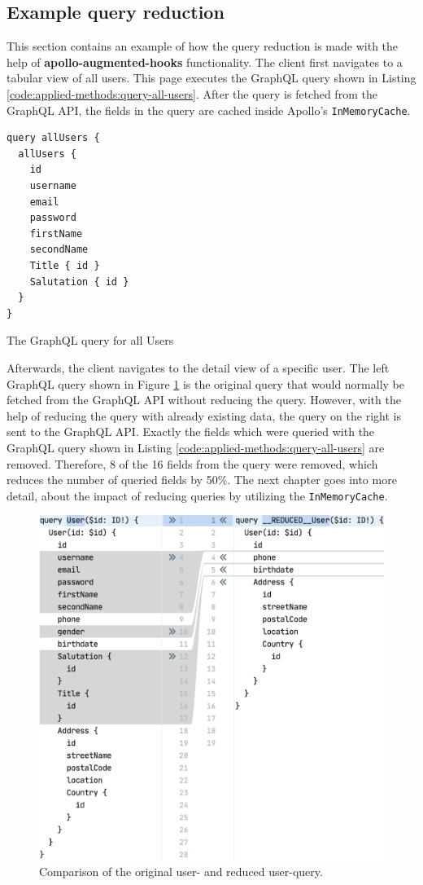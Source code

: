 \subsection{Example query reduction}\label{subsection:background:graphql:example-reduction}

This section contains an example of how the query reduction is made with the help of \textbf{apollo-augmented-hooks} functionality. The client first navigates to a tabular view of all users. This page executes the GraphQL query shown in Listing \ref{code:applied-methods:query-all-users}. After the query is fetched from the GraphQL \ac{API}, the fields in the query are cached inside Apollo's \texttt{InMemoryCache}.

\ifshowListings
\begin{listing}[H]
\begin{verbatim}
query allUsers {
  allUsers {
    id
    username
    email
    password
    firstName
    secondName
    Title { id }
    Salutation { id }
  }
}
\end{verbatim}
\caption{The GraphQL query for all Users}\label{code:applied-methods:query-all-users}
\end{listing}
\fi

\noindent Afterwards, the client navigates to the detail view of a specific user. The left GraphQL query shown in Figure \ref{fig:applied-methods:comparison-user-reduced-user} is the original query that would normally be fetched from the GraphQL \ac{API} without reducing the query. However, with the help of reducing the query with already existing data, the query on the right is sent to the GraphQL \ac{API}. Exactly the fields which were queried with the GraphQL query shown in Listing \ref{code:applied-methods:query-all-users} are removed. Therefore, 8 of the 16 fields from the query were removed, which reduces the number of queried fields by 50\%. The next chapter goes into more detail, about the impact of reducing queries by utilizing the \texttt{InMemoryCache}.

\ifshowImages
  \begin{figure}[H]
  \centering
  \includegraphics[width=0.65\linewidth]{images/reduction-graphql-examples/compare-user-reduced-user.png}
  \caption{Comparison of the original user- and reduced user-query.}\label{fig:applied-methods:comparison-user-reduced-user}
  \end{figure}
\fi
